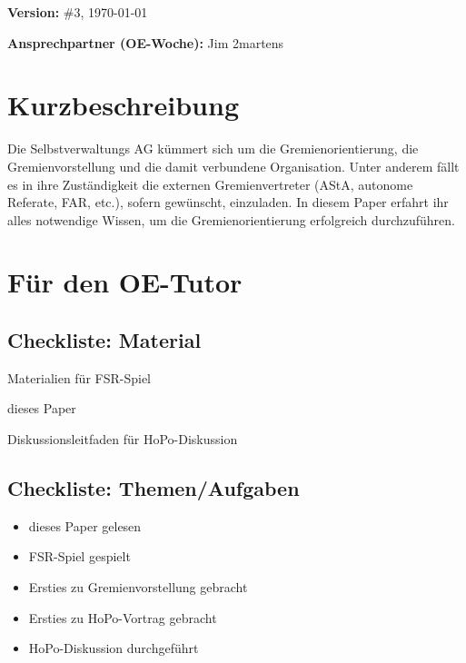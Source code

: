 \documentclass[a4paper,11pt]{scrartcl} %
\newenvironment{myitemize}{\begin{itemize}\itemsep -2pt}{\end{itemize}} %
\begin{document}
\thispagestyle{firststyle}

\begin{wrapfigure}{r}{130pt}
\vspace{-45pt}
  \fbox{
  \begin{minipage}{140pt}
   \tableofcontents
  \end{minipage}
  }
\end{wrapfigure}

\textbf{Version:} \#3, \today %

\textbf{Ansprechpartner (OE-Woche):} Jim 2martens %

\section{Kurzbeschreibung}
    Die Selbstverwaltungs AG kümmert sich um die 
Gremienorientierung, die Gremienvorstellung und die damit 
verbundene Organisation. Unter anderem fällt es in ihre 
Zuständigkeit die externen Gremienvertreter (AStA, autonome 
Referate, FAR, etc.), sofern gewünscht, einzuladen. In diesem 
Paper erfahrt ihr alles notwendige Wissen, um die 
Gremienorientierung erfolgreich durchzuführen.

\section{Für den OE-Tutor}
  \subsection{Checkliste: Material} %
    \begin{multicols}{2}[]
      \begin{myitemize}
      \begin{raggedright}
	\item[\Square] Materialien für FSR-Spiel
	\item[\Square] dieses Paper
	\item[\Square] Diskussionsleitfaden für HoPo-Diskussion
      \end{raggedright}
      \end{myitemize}
    \end{multicols}
  \subsection{Checkliste: Themen/Aufgaben} %
      \begin{myitemize}
    \item[\Square] dieses Paper gelesen  
	\item[\Square] FSR-Spiel gespielt
	\item[\Square] Ersties zu Gremienvorstellung gebracht
	\item[\Square] Ersties zu HoPo-Vortrag gebracht
	\item[\Square] HoPo-Diskussion durchgeführt
      \end{myitemize}
    
\end{document}
